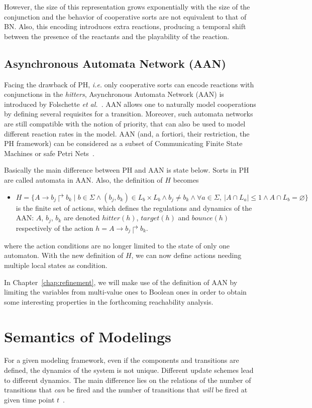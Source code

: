 However, the size of this representation grows exponentially with the size of the conjunction and the behavior of cooperative sorts are not equivalent to that of BN. 
Also, this encoding introduces extra reactions, producing a temporal shift between the presence of the reactants and the playability of the reaction.

\subsection{Asynchronous Automata Network (AAN)}\label{sec:AAN}
Facing the drawback of PH, \textit{i.e.} only cooperative sorts can encode reactions with conjunctions in the \textit{hitters}, Asynchronous Automata Network (AAN) is introduced by Folschette \textit{et al.}~\cite{folschette2015}.
AAN allows one to naturally model cooperations by defining several requisites for a transition.
Moreover, such automata networks are still compatible with the notion of priority, that can also be used to model different reaction rates in the model.
AAN (and, a fortiori, their restriction, the PH framework) can be considered as a subset of Communicating Finite State Machines or safe Petri Nets~\cite{pauleve2012process}.

Basically the main difference between PH and AAN is state below. 
Sorts in PH are called automata in AAN.
Also, the definition of $H$ becomes

\begin{itemize}
    \item $H=\{A\to b_j\Rsh b_k\mid b\in \Sigma \land (b_j,b_k)\in L_b\times L_b\land b_j\neq b_k\land \forall a \in \Sigma,\ |A\cap L_a|\leq 1 \land A\cap L_b=\varnothing\}$ is the finite set of actions, which defines the regulations and dynamics of the AAN: $A$, $b_j$, $b_k$ are denoted $hitter(h)$, $target(h)$ and $bounce(h)$ respectively of the action $h=A\to b_j\Rsh b_k$.
\end{itemize}

where the action conditions are no longer limited to the state of only one automaton.
With the new definition of $H$, we can now define actions needing multiple local states as condition.

In Chapter~\ref{chap:refinement}, we will make use of the definition of AAN by limiting the variables from multi-value ones to Boolean ones in order to obtain some interesting properties in the forthcoming reachability analysis.


\section{Semantics of Modelings}\label{sec:semantics}
For a given modeling framework, even if the components and transitions are defined, the dynamics of the system is not unique. 
Different update schemes lead to different dynamics.
The main difference lies on the relations of the number of transitions that %
\textit{can} be fired and the number of transitions that %
\textit{will} be fired at given time point $t$~\cite{ribeiro2018learning,chatain2018boolean}.

